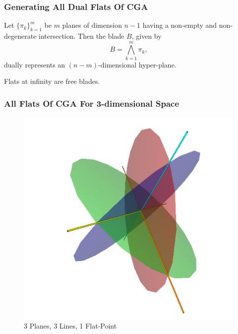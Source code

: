 \documentclass{beamer}
\begin{document}
\begin{frame}
\frametitle{Generating All \alert{Dual Flats} Of CGA}
Let $\{\pi_k\}_{k=1}^m$ be $m$ planes of dimension $n-1$ having a \alert{non-empty} and
\alert{non-degenerate} intersection.
Then the blade $B$, given by
\begin{equation*}
B = \bigwedge_{k=1}^m\pi_k,
\end{equation*}
\alert{dually} represents an $(n-m)$-dimensional hyper-plane.

\alert{Flats} at infinity are \alert{free blades}.
\end{frame}

\begin{frame}
\frametitle{All Flats Of CGA For 3-dimensional Space}
\begin{figure}
\centering
\includegraphics[scale=0.2]{Flats}
\caption{3 Planes, 3 Lines, 1 Flat-Point}
\end{figure}
\end{frame}
\end{document}
